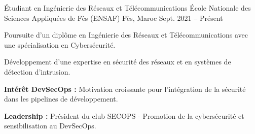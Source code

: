 
\begin{cventries}

    \cventry
    {Étudiant en Ingénierie des Réseaux et Télécommunications}
    {École Nationale des Sciences Appliquées de Fès (ENSAF)} %
    {Fès, Maroc} %
    {Sept. 2021 – Présent} %
    {
        \begin{cvitems} %
            \item {Poursuite d'un diplôme en Ingénierie des Réseaux et Télécommunications avec une spécialisation en Cybersécurité.}
            \item {Développement d'une expertise en sécurité des réseaux et en systèmes de détection d'intrusion.}
            \item {\textbf{Intérêt DevSecOps :} Motivation croissante pour l'intégration de la sécurité dans les pipelines de développement.}
            \item {\textbf{Leadership :} Président du club SECOPS - Promotion de la cybersécurité et sensibilisation au DevSecOps.}
        \end{cvitems}
    }



\end{cventries}